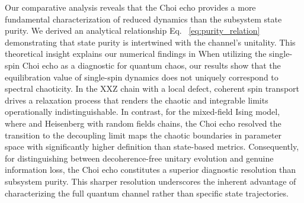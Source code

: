 \documentclass[pra,twocolumn,aps,showpacs,superscriptaddress,longbibliography]{revtex4-2}%
\providecommand{\DIFadd}[1]{{\protect\color{blue} \sf #1}} %
\providecommand{\DIFdel}[1]{{\protect\color{red} \scriptsize #1}} %
\providecommand{\DIFaddbegin}{} %
\providecommand{\DIFaddend}{} %
\providecommand{\DIFdelbegin}{} %
\providecommand{\DIFdelend}{} %
\begin{document}
\DIFdelbegin \DIFdel{Our comparative analysis reveals that the Choi echo provides a more fundamental characterization of reduced dynamics than the subsystem state purity. We derived an analytical relationship }%
\DIFdel{Eq. ~\eqref{eq:purity_relation}}%
\DIFdel{demonstrating that state purity is intertwined with the channel's unitality. This theoretical insight explains our numerical findings in }\DIFdelend \DIFaddbegin \DIFadd{When utilizing the single-spin Choi echo as a diagnostic for quantum chaos, our results show that the equilibration value of single-spin dynamics does not uniquely correspond to spectral chaoticity. In the XXZ chain with a local defect, coherent spin transport drives a relaxation process that renders the chaotic and integrable limits operationally indistinguishable. In contrast, for }\DIFaddend the mixed-field Ising \DIFdelbegin \DIFdel{model, where }\DIFdelend \DIFaddbegin \DIFadd{and Heisenberg with random fields chains, }\DIFaddend the Choi echo \DIFdelbegin \DIFdel{resolved the transition to the decoupling limit }\DIFdelend \DIFaddbegin \DIFadd{maps the chaotic boundaries in parameter space }\DIFaddend with significantly higher \DIFdelbegin \DIFdel{definition than state-based metrics. Consequently, for distinguishing between decoherence-free unitary evolution and genuine information loss, the Choi echo constitutes a superior diagnostic}\DIFdelend \DIFaddbegin \DIFadd{resolution than subsystem purity. This sharper resolution underscores the inherent advantage of characterizing the full quantum channel rather than specific state trajectories}\DIFaddend .
\end{document}
